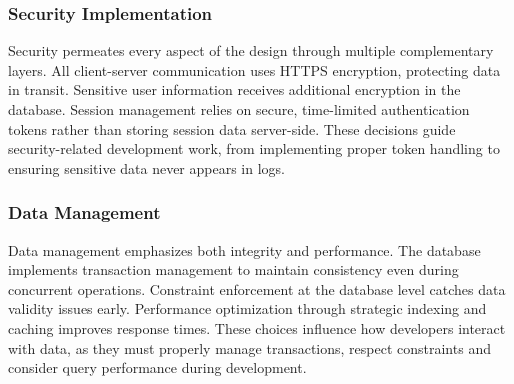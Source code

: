 \subsubsection{Security Implementation}
Security permeates every aspect of the design through multiple complementary layers.
All client-server communication uses HTTPS encryption, protecting data in transit.
Sensitive user information receives additional encryption in the database.
Session management relies on secure, time-limited authentication tokens rather than storing session data server-side.
These decisions guide security-related development work, from implementing proper token handling to ensuring sensitive data never appears in logs.

\subsubsection{Data Management}
Data management emphasizes both integrity and performance.
The database implements transaction management to maintain consistency even during concurrent operations.
Constraint enforcement at the database level catches data validity issues early.
Performance optimization through strategic indexing and caching improves response times.
These choices influence how developers interact with data, as they must properly manage transactions, respect constraints and consider query performance during development.
